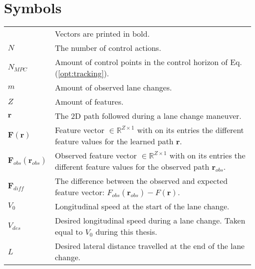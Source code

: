 \documentclass[master=wtk,english]{kulemt}
\begin{document}
\section*{Symbols}
\begin{flushleft}
  \renewcommand{\arraystretch}{1.1}
  \begin{tabularx}{\textwidth}{@{}p{12mm}X@{}}
  		& Vectors are printed in bold. \\
    $N$    &  The number of control actions.\\
    $N_{MPC}$ & Amount of control points in the control horizon of Eq. (\ref{opt:tracking}).\\
    $m$ & Amount of observed lane changes.\\
    $Z$ & Amount of features.\\
    $\bm{r}$ & The 2D path followed during a lane change maneuver.\\
    $\bm{F}(\bm{r})$ & Feature vector $\in \mathbb{R}^{Z\times 1}$ with on its entries the different feature values for the learned path $\bm{r}$.\\
    $\bm{F}_{obs}(\bm{r}_{obs})$ & Observed feature vector $\in \mathbb{R}^{Z\times 1}$ with on its entries the different feature values for the observed path $\bm{r}_{obs}$.\\
    $\bm{F}_{diff}$ & The difference between the observed and expected feature vector: $F_{obs}(\bm{r}_{obs}) - F(\bm{r})$.\\
    $V_{0}$ & Longitudinal speed at the start of the lane change.\\
    $V_{des}$ & Desired longitudinal speed during a lane change. Taken equal to $V_{0}$ during this thesis.\\
   $L$   & Desired lateral distance travelled at the end of the lane change.
    
    
 
	\end{tabularx}
\end{flushleft}
\end{document}

